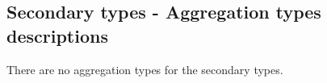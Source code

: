 \subsection{Secondary types - Aggregation types descriptions}



There are no aggregation types for the secondary types.


